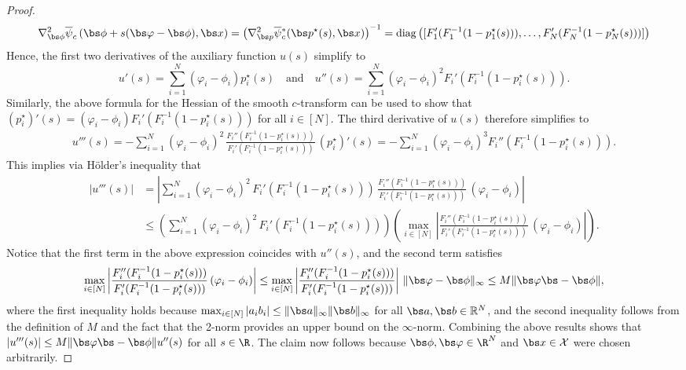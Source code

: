 \documentclass[11pt, a4paper, oneside, reqno]{article}
\begin{document}
\begin{proof}
		$$ \nabla_{\bs \phi}^2 \overline \psi_c \left(\bs \phi + s (\bs \varphi - \bs \phi), \bs x \right) = \left( \nabla^2_{\bs p} \overline \psi{}_c^*(\bs p^\star(s), \bs x) \right)^{-1} = \mathrm{diag} \left( [F_1'(F_1^{-1}(1 - p_1^\star(s))), \dots, F_N'(F_N^{-1}(1 - p_N^\star(s))) ] \right)$$
		Hence, the first two derivatives of the auxiliary function $u(s)$ simplify to
		$$ u'(s) = \sum_{i=1}^N (\varphi_i- \phi_i) p^\star_i(s) \quad \text{and} \quad u''(s) = \sum_{i=1}^N (\varphi_i- \phi_i)^2 F_i'(F_i^{-1}(1 - p_i^\star(s))).$$
		Similarly, the above formula for the Hessian of the smooth $c$-transform can be used to show that $(p_i^\star)'(s)  = (\varphi_i- \phi_i) F_i'(F_i^{-1}(1 - p_i^\star(s)))$ for all $i \in [N]$. The third derivative of $u(s)$ therefore simplifies to
		\begin{align*}
		    u'''(s) = - \sum_{i=1}^N (\varphi_i- \phi_i)^2 \,\frac{ F_i''(F_i^{-1}(1 - p_i^\star(s)))}{F_i'(F_i^{-1}(1 - p_i^\star(s)))}\, (p_i^\star)'(s) = - \sum_{i=1}^N (\varphi_i- \phi_i)^3 F_i''(F_i^{-1}(1 - p_i^\star(s))).
		\end{align*}
		This implies via H\"{o}lder's inequality that
		\begin{align*}
		| u'''(s) | 
		&= \left| \sum_{i=1}^N  (\varphi_i- \phi_i)^2\, F_i'(F_i^{-1}(1 - p_i^\star(s))) \, \frac{F_i''(F_i^{-1}(1 - p_i^\star(s)))}{F_i'(F_i^{-1}(1 - p_i^\star(s)))} \, (\varphi_i- \phi_i) \right| \\
		&\leq \left( \sum_{i=1}^N (\varphi_i- \phi_i)^2\, F_i'(F_i^{-1}(1 - p_i^\star(s))) \right) \left( \max_{i \in [N]} \left| \frac{F_i''(F_i^{-1}(1 - p_i^\star(s)))}{F_i'(F_i^{-1}(1 - p_i^\star(s)))} \, (\varphi_i- \phi_i) \right| \right).
		\end{align*}
		Notice that the first term in the above expression coincides with $u''(s)$, and the second term satisfies
		\begin{align*}
		\max_{i \in [N]} \left| \frac{F_i''(F_i^{-1}(1 - p_i^\star(s)))}{F_i'(F_i^{-1}(1 - p_i^\star(s)))} \, (\varphi_i- \phi_i) \right| 
		\leq \max_{i \in [N]} \left| \frac{F_i''(F_i^{-1}(1 - p_i^\star(s)))}{F_i'(F_i^{-1}(1 - p_i^\star(s)))} \right| \, \| \bs \varphi - \bs \phi \|_\infty \leq M \| \bs \varphi \bs - \bs \phi \|,
		\end{align*}
		where the first inequality holds because $\max_{i \in [N]} |a_i b_i| \leq \| \bs a \|_{\infty} \| \bs b \|_\infty $ for all $\bs a, \bs b \in \mathbb R^N$, and the second inequality follows from the definition of $M$ and the fact that the 2-norm provides an upper bound on the $\infty$-norm. Combining the above results shows that $|u'''(s)|\leq M  \| \bs \varphi \bs - \bs \phi \| u''(s)$ for all $s\in\R$. The claim now follows because $\bs \phi, \bs \varphi \in \R^N$ and $\bs x \in \mathcal X$ were chosen arbitrarily. 
	\end{proof}
	
\end{document}
